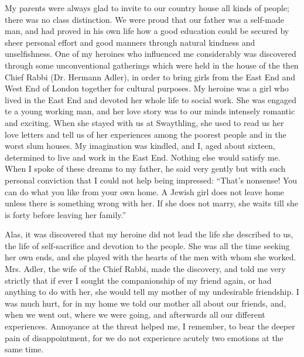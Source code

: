 My parents were always glad to invite to our country
house all kinds of people; there was no class distinction.
We were proud that our father was a self-made man, and
had proved in his own life how a good education could be
secured by sheer personal effort and good manners
through natural kindness and unselfishness. One of my
heroines who influenced me considerably was discovered
through some unconventional gatherings which were held
in the house of the then Chief Rabbi (Dr. Hermann
Adler), in order to bring girls from the East End and
West End of London together for cultural purposes. My
heroine was a girl who lived in the East End and devoted
her whole life to social work. She was engaged te a young
working man, and her love story was to our minds
intensely romantic and exciting. When she stayed with
us at Swaythling, she used to read us her love letters and
tell us of her experiences among the poorest people and
in the worst slum houses. My imagination was kindled,
and I, aged about sixteen, determined to live and work
in the East End. Nothing else would satisfy me. When
I spoke of these dreams to my father, he said very gently
but with such personal conviction that I could not help
being impressed: “That’s nonsense! You can do what
you like from your own home. A Jewish girl does not
leave home unless there is something wrong with her. If
she does not marry, she waits till she is forty before leaving
her family.”

Alas, it was discovered that my heroine did not lead the
life she described to us, the life of self-sacrifice and devotion
to the people. She was all the time seeking her own
ends, and she played with the hearts of the men with
whom she worked. Mrs. Adler, the wife of the Chief
Rabbi, made the discovery, and told me very strictly that
if ever I sought the companionship of my friend again, or
had anything to do with her, she would tell my mother
of my undesirable friendship. I was much hurt, for in
my home we told our mother all about our friends, and,
when we went out, where we were going, and afterwards
all our different experiences. Annoyance at the threat
helped me, I remember, to bear the deeper pain of
disappointment, for we do not experience acutely two
emotions at the same time.

